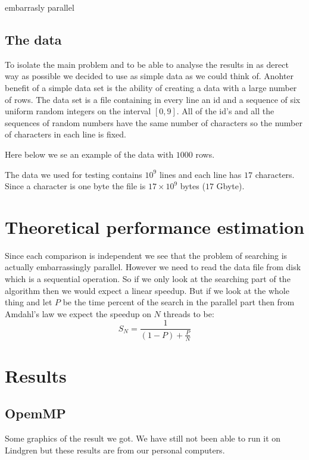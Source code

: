 \documentclass[a4paper,10pt]{article}
\begin{document}
embarrasly parallel


\subsection{The data}
To isolate the main problem and to be able to analyse the results in as derect way as possible we decided to use as simple data as we could think of.
Anohter benefit of a simple data set is the ability of creating a data with a large number of rows. 
The data set is a file containing in every line an id and a sequence of six uniform random integers on the interval $[0,9]$.  
All of the id's and all the sequences of random numbers have the same number of characters so the number of characters in each line is fixed.

Here below we se an example of the data with $1000$ rows.
  
The data we used for testing contains $10^{9}$ lines and each line has $17$ characters.  Since a character is one byte
the file is $17 \times 10^9$ bytes ($17$ Gbyte).


\section{Theoretical performance estimation}

Since each comparison is independent we see that the problem of searching is actually embarrassingly parallel.  
However we need to read the data file from disk which is a sequential operation.  
So if we only look at the searching part of the algorithm then we would expect a linear speedup.  
But if we look at the whole thing and let $P$ be the time percent of the search in the parallel  
part then from Amdahl's law we expect the speedup on $N$ threads to be:
$$ S_N = \frac{1}{(1-P)+\frac{P}{N}}$$

\section{Results}

\subsection{OpemMP}
 
Some graphics of the result we got.  We have still not been able to run it on Lindgren but these 
results are from our personal computers.
\end{document}
